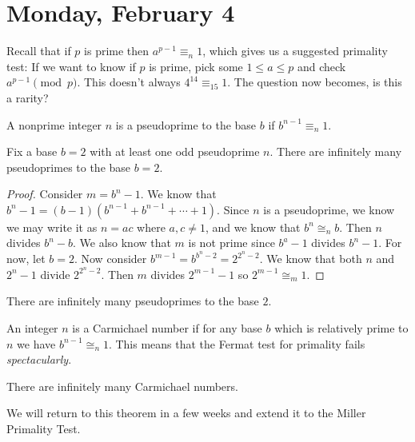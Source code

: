 
\section{Monday, February 4}

Recall that if $p$ is prime then $a^{p-1} \equiv_n 1$, which gives us a suggested primality test: If we want to know if $p$ is prime, pick some $1 \leq a \leq p$ and check $a^{p-1} \pmod{p}$. This doesn't always $4^{14} \equiv_{15} 1 $. The question now becomes, is this a rarity?

\begin{definition}[Pseudoprime]
A nonprime integer $n$ is a pseudoprime to the base $b$ if $b^{n-1} \equiv_n 1$.
\end{definition}

\begin{theorem}
Fix a base $b=2$ with at least one odd pseudoprime $n$. There are infinitely many pseudoprimes to the base $b=2$.
\end{theorem}

\begin{proof}
Consider $m = b^n - 1$. We know that $b^n - 1 = (b-1)(b^{n-1} + b^{n-1} + \cdots + 1)$. Since $n$ is a pseudoprime, we know we may write it as $n = ac$ where $a,c \not= 1$, and we know that $b^n \cong_n b$. Then $n$ divides $b^n - b$. We also know that $m$ is not prime since $b^a - 1$ divides $b^n - 1$.
For now, let $b=2$. Now consider $b^{m-1} = b^{b^n - 2} = 2^{2^n - 2}$. We know that both $n$ and $2^{n}-1$ divide $2^{2^n-2}$. Then $m$ divides $2^{m-1}-1$ so $2^{m-1} \cong_m 1$.
\end{proof}

\begin{corollary}
There are infinitely many pseudoprimes to the base $2$.
\end{corollary}

\begin{definition}
An integer $n$ is a Carmichael number if for any base $b$ which is relatively prime to $n$ we have $b^{n-1} \cong_n 1$. This means that the Fermat test for primality fails \emph{spectacularly}.
\end{definition}

\begin{theorem}
There are infinitely many Carmichael numbers.
\end{theorem}

We will return to this theorem in a few weeks and extend it to the Miller Primality Test.

